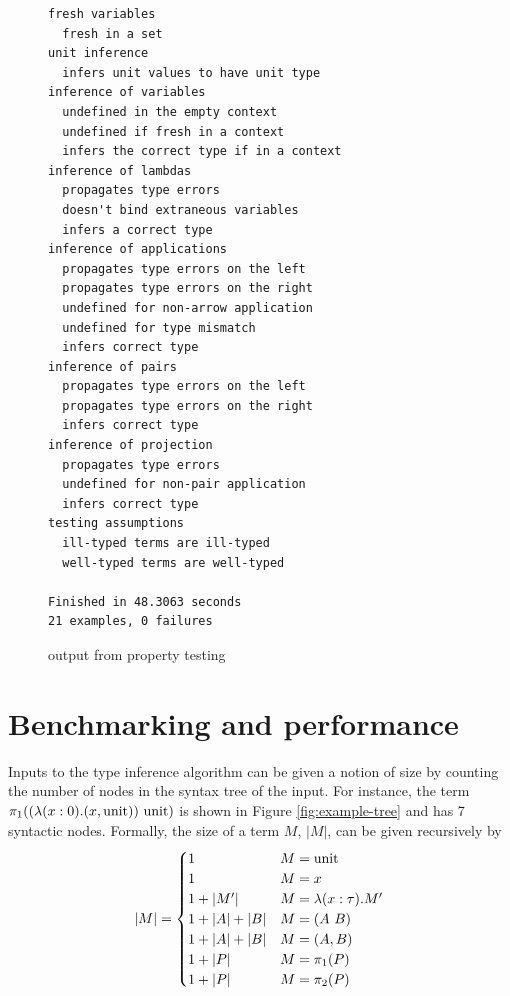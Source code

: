 \begin{figure}
\centering
\begin{verbatim}
fresh variables
  fresh in a set
unit inference
  infers unit values to have unit type
inference of variables
  undefined in the empty context
  undefined if fresh in a context
  infers the correct type if in a context
inference of lambdas
  propagates type errors
  doesn't bind extraneous variables
  infers a correct type
inference of applications
  propagates type errors on the left
  propagates type errors on the right
  undefined for non-arrow application
  undefined for type mismatch
  infers correct type
inference of pairs
  propagates type errors on the left
  propagates type errors on the right
  infers correct type
inference of projection
  propagates type errors
  undefined for non-pair application
  infers correct type
testing assumptions
  ill-typed terms are ill-typed
  well-typed terms are well-typed

Finished in 48.3063 seconds
21 examples, 0 failures
\end{verbatim}
\caption{output from property testing}
\label{fig:tests-output}
\end{figure}

\section{Benchmarking and performance}
\label{sec:benchmarking}
Inputs to the type inference algorithm can be given a notion of size by counting the number of nodes in the syntax tree of the input.
For instance, the term \(\pi_1((\lambda (x : 0). (x, \mathrm{unit}))\ \mathrm{unit})\) is shown in Figure \ref{fig:example-tree} and has 7 syntactic nodes.
Formally, the size of a term \(M\), \(|M|\), can be given recursively by
\[
|M| =
\begin{cases}
1 & M = \mathrm{unit}\\
1 & M = x\\
1 + |M'| & M = \lambda (x : \tau). M'\\
1 + |A| + |B| & M = (A\ B)\\
1 + |A| + |B| & M = (A, B)\\
1 + |P| & M = \pi_1(P)\\
1 + |P| & M = \pi_2(P)\\
\end{cases}
\]

